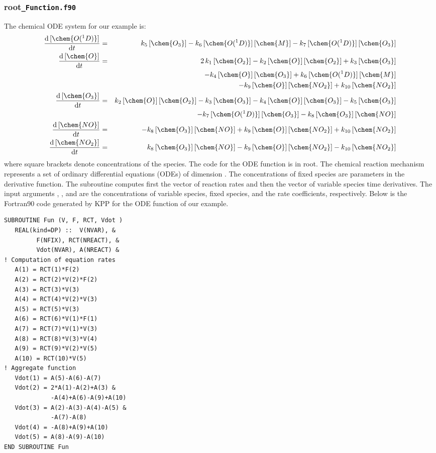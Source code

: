 \documentclass[twoside]{article}
\newcommand{\kpproot}{{\sc root}}
\begin{document}
\subsubsection{\kpproot{\tt\_Function.f90}}
\label{sec:output-ode-fun}

The chemical ODE system for our example is:
%
\def\dd{{\mathrm{d}}}
\begin{eqnarray*}
  \frac{\dd\, [\chem{O(^1D)}]}{\dd t} & = & k_{5}\, [\chem{O_3}] - k_{6}\,
  [\chem{O(^1D)}]\, [\chem{M}] - k_{7}\, [\chem{O(^1D)}]\, [\chem{O_3}]\\
  \frac{\dd\, [\chem{O}]}{\dd t} & = & 2\, k_{1}\, [\chem{O_2}] - k_{2}\,
  [\chem{O}]\, [\chem{O_2}] + k_{3}\, [\chem{O_3}]\\
  & & - k_{4}\, [\chem{O}]\, [\chem{O_3}]+ k_{6}\, [\chem{O(^1D)}]\,
  [\chem{M}]\\
  & & - k_{9}\, [\chem{O}]\, [\chem{NO_2}] + k_{10}\, [\chem{NO_2}]\\
  \frac{\dd\, [\chem{O_3}]}{\dd t} & = & k_{2}\, [\chem{O}]\, [\chem{O_2}] -
  k_{3}\, [\chem{O_3}] - k_{4}\, [\chem{O}]\, [\chem{O_3}] - k_{5}\,
  [\chem{O_3}]\\
  & & - k_{7}\, [\chem{O(^1D)}]\, [\chem{O_3}] - k_{8}\, [\chem{O_3}]\, 
  [\chem{NO}]\\
  \frac{\dd\, [\chem{NO}]}{\dd t} & = & - k_{8}\, [\chem{O_3}]\, [\chem{NO}] +
  k_{9}\, [\chem{O}]\, [\chem{NO_2}] + k_{10}\, [\chem{NO_2}]\\
  \frac{\dd\, [\chem{NO_2}]}{\dd t} & = & k_{8}\, [\chem{O_3}]\, [\chem{NO}] -
  k_{9}\, [\chem{O}]\, [\chem{NO_2}] - k_{10}\, [\chem{NO_2}]
\end{eqnarray*}
%
where square brackets denote concentrations of the species. The code for
the ODE function is in \kpproot{}. The chemical
reaction mechanism represents a set of ordinary differential equations
(ODEs) of dimension . The concentrations of fixed species are
parameters in the derivative function. The subroutine 
computes first the vector  of reaction rates and then the vector
 of variable species time derivatives. The input arguments
, , and  are the concentrations of variable
species, fixed species, and the rate coefficients, respectively. Below
is the Fortran90 code generated by KPP for the ODE function of our
 example.
%
\begin{verbatim}
SUBROUTINE Fun (V, F, RCT, Vdot )
   REAL(kind=DP) ::  V(NVAR), &
         F(NFIX), RCT(NREACT), &
         Vdot(NVAR), A(NREACT) &
! Computation of equation rates
   A(1) = RCT(1)*F(2)
   A(2) = RCT(2)*V(2)*F(2)
   A(3) = RCT(3)*V(3)
   A(4) = RCT(4)*V(2)*V(3)
   A(5) = RCT(5)*V(3)
   A(6) = RCT(6)*V(1)*F(1)
   A(7) = RCT(7)*V(1)*V(3)
   A(8) = RCT(8)*V(3)*V(4)
   A(9) = RCT(9)*V(2)*V(5)
   A(10) = RCT(10)*V(5)
! Aggregate function
   Vdot(1) = A(5)-A(6)-A(7)
   Vdot(2) = 2*A(1)-A(2)+A(3) &
             -A(4)+A(6)-A(9)+A(10)
   Vdot(3) = A(2)-A(3)-A(4)-A(5) &
             -A(7)-A(8)
   Vdot(4) = -A(8)+A(9)+A(10)
   Vdot(5) = A(8)-A(9)-A(10)
END SUBROUTINE Fun
\end{verbatim}
\end{document}
